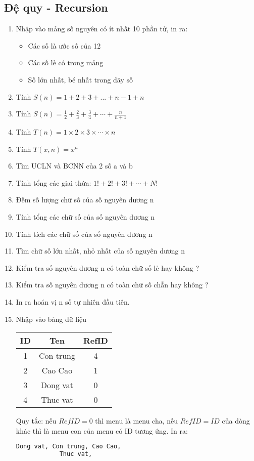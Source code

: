 \documentclass[12pt,a4paper]{article}
\begin{document}
\subsection{Đệ quy - Recursion}
\begin{enumerate}
	\item Nhập vào mảng số nguyên có ít nhất 10 phần tử, in ra:
	\begin{itemize}
		\item Các số là ước số của 12
		\item Các số lẻ có trong mảng
		\item Số lớn nhất, bé nhất trong dãy số
	\end{itemize}		
	 
	\item Tính $S(n) = 1 + 2 + 3 + ... + n - 1 + n$
	\item Tính $S(n) = \frac{1}{2} + \frac{2}{3} + \frac{3}{4} + \cdots + \frac{n}{n + 1}$
	\item Tính $T(n) = 1\times 2\times 3\times \cdots \times n$
	\item Tính $T(x,n) = x^n$
	\item Tìm UCLN và BCNN của 2 số a và b
	\item Tính tổng các giai thừa: $1! + 2! + 3!+ \cdots + N!$
	\item Đếm số lượng chữ số của số nguyên dương n
	\item Tính tổng các chữ số của số nguyên dương n
	\item Tính tích các chữ số của số nguyên dương n
	\item Tìm chữ số lớn nhất, nhỏ nhất của số nguyên dương n
	\item Kiểm tra số nguyên dương n có toàn chữ số lẻ hay không ?
	\item Kiểm tra số nguyên dương n có toàn chữ số chẵn hay không ?
	\item In ra hoán vị n số tự nhiên đầu tiên.
	
	\item Nhập vào bảng dữ liệu
		\begin{center}
			\begin{tabular}{ |c|c|c| } 
				\hline
					ID & Ten & RefID \\
				\hline
					1 & Con trung & 4 \\
				\hline
					2 & Cao Cao & 1 \\
				\hline	
					3 & Dong vat & 0 \\
				\hline
					4 & Thuc vat & 0 \\
				\hline
			\end{tabular}
		\end{center}
		Quy tắc: nếu $RefID = 0$ thì menu là menu cha, nếu $RefID = ID$ của dòng khác thì là menu con của menu có ID tương ứng. In ra:
		\begin{lstlisting}[language=bash]
			Dong vat, Con trung, Cao Cao,
			Thuc vat, 
		\end{lstlisting}
		
\end{enumerate}
\end{document}
